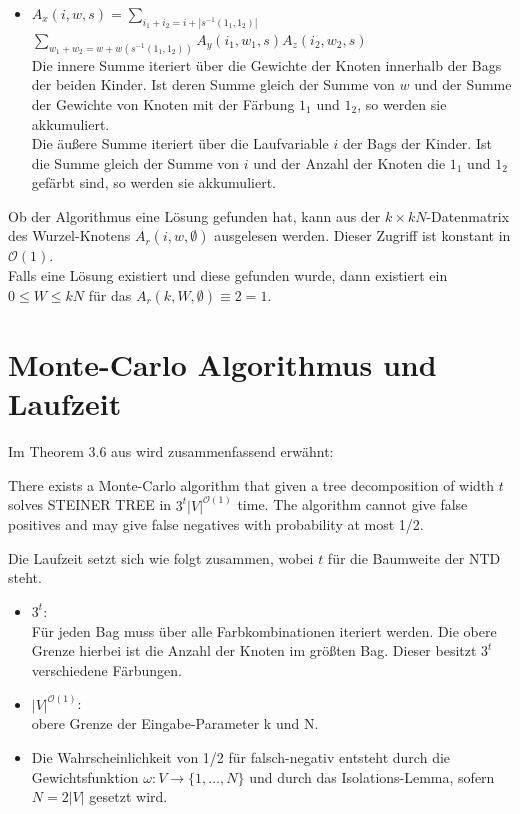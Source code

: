 \begin{itemize}
\begin{itemize}
\item $A_x(i,w,s) = \sum\limits_{i_1+i_2=i+|s^{-1}({1_1,1_2})|}$   $\sum\limits_{w_1+w_2=w+w(s^{-1}({1_1,1_2}))} A_y(i_1,w_1,s)A_z(i_2,w_2,s) $\\Die innere Summe iteriert über die Gewichte der Knoten innerhalb der Bags der beiden Kinder. Ist deren Summe gleich der Summe von $w$ und der Summe der Gewichte von Knoten mit der Färbung $1_1$ und $1_2$, so werden sie akkumuliert.
\\Die äußere Summe iteriert über die Laufvariable $i$ der Bags der Kinder. Ist die Summe gleich der Summe von $i$ und der Anzahl der Knoten die $1_1$ und $1_2$ gefärbt sind, so werden sie akkumuliert.
\end{itemize}
\end{itemize}


Ob der Algorithmus eine Lösung gefunden hat, kann aus der $k \times kN$-Datenmatrix des Wurzel-Knotens $A_r(i,w,\emptyset)$ ausgelesen werden. 
Dieser Zugriff ist konstant in $\mathcal{O}(1)$.\\
Falls eine Lösung existiert und diese gefunden wurde, dann existiert ein $0 \leq W \leq kN$ für das $A_r(k,W,\emptyset) \equiv 2 = 1$.

\section{Monte-Carlo Algorithmus und Laufzeit}
\label{sec:mc_alg}
Im Theorem 3.6 aus \cite{cygan_solving_2011} wird zusammenfassend erwähnt:
\begin{theorem}
There exists a Monte-Carlo algorithm that given a tree decomposition of width $t$ solves STEINER TREE in $3^t|V|^{\mathcal{O}(1)}$ time. The algorithm cannot give false positives and may give false negatives with probability at most 1/2.
\end{theorem}

Die Laufzeit setzt sich wie folgt zusammen, wobei $t$ für die Baumweite der NTD steht.
\begin{itemize}
\item $3^t$:\\ Für jeden Bag muss über alle Farbkombinationen iteriert werden. Die obere Grenze hierbei ist die Anzahl der Knoten im größten Bag. Dieser besitzt $3^t$ verschiedene Färbungen.
\item $|V|^{\mathcal{O}(1)}$:\\ obere Grenze der Eingabe-Parameter k und N.
\item Die Wahrscheinlichkeit von 1/2 für falsch-negativ entsteht durch die Gewichtsfunktion $\omega:V\rightarrow \{1,\dots,N\}$ und durch das Isolations-Lemma, sofern $N=2|V|$ gesetzt wird. 
\end{itemize}